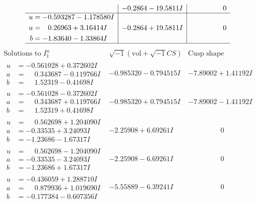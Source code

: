 \documentclass[1p]{elsarticle_modified}
\theoremstyle{definition}
\newcommand{\I}{\sqrt{-1}}
\begin{document}
$$\begin{array}{c|c|c}
 & -0.2864 - 19.5811 I & \phantom{-0.000000 } 0 \\ \hline\begin{aligned}
u &= -0.593287 - 1.178580 I \\
a &= \phantom{-}0.26963 + 3.16414 I \\
b &= -1.83640 - 1.33864 I\end{aligned}
 & -0.2864 + 19.5811 I & \phantom{-0.000000 } 0\\
 \hline 
 \end{array}$$\newpage$$\begin{array}{c|c|c}  
\text{Solutions to }I^u_{1}& \I (\text{vol} + \sqrt{-1}CS) & \text{Cusp shape}\\
 \hline 
\begin{aligned}
u &= -0.561028 + 0.372602 I \\
a &= \phantom{-}0.343687 - 0.119766 I \\
b &= \phantom{-}1.52319 - 0.41698 I\end{aligned}
 & -0.985320 - 0.794515 I & -7.89002 + 1.41192 I \\ \hline\begin{aligned}
u &= -0.561028 - 0.372602 I \\
a &= \phantom{-}0.343687 + 0.119766 I \\
b &= \phantom{-}1.52319 + 0.41698 I\end{aligned}
 & -0.985320 + 0.794515 I & -7.89002 - 1.41192 I \\ \hline\begin{aligned}
u &= \phantom{-}0.562698 + 1.204090 I \\
a &= -0.33535 + 3.24093 I \\
b &= -1.23686 - 1.67317 I\end{aligned}
 & -2.25908 + 6.69261 I & \phantom{-0.000000 } 0 \\ \hline\begin{aligned}
u &= \phantom{-}0.562698 - 1.204090 I \\
a &= -0.33535 - 3.24093 I \\
b &= -1.23686 + 1.67317 I\end{aligned}
 & -2.25908 - 6.69261 I & \phantom{-0.000000 } 0 \\ \hline\begin{aligned}
u &= -0.436059 + 1.288710 I \\
a &= \phantom{-}0.879936 + 1.019690 I \\
b &= -0.177384 - 0.607356 I\end{aligned}
 & -5.55889 - 6.39241 I & \phantom{-0.000000 } 0 \\ \hline\begin{aligned}

\end{aligned}
\end{array}$$
\end{document}
